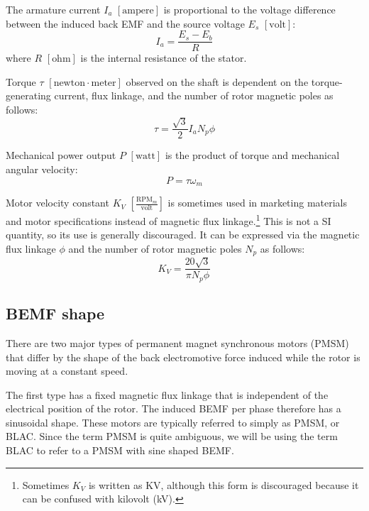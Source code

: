 \documentclass{zubaxdoc}
\begin{document}
The armature current $I_a$ $\left[\text{ampere}\right]$ is proportional to
the voltage difference between the induced back EMF and
the source voltage $E_s$ $\left[\text{volt}\right]$:
\begin{equation}
I_a = \frac{E_s - E_b}{R}
\end{equation}
where $R$ $\left[\text{ohm}\right]$ is the internal resistance of the stator.

Torque $\tau$ $\left[\text{newton}\cdot{}\text{meter}\right]$ observed on the shaft is dependent on the
torque-generating current, flux linkage, and the number of rotor magnetic poles as follows:
\begin{equation}
\tau = \frac{\sqrt{3}}{2} I_a N_p \phi
\end{equation}

Mechanical power output $P$ $\left[\text{watt}\right]$
is the product of torque and mechanical angular velocity:
\begin{equation}
P = \tau \omega_m
\end{equation}

Motor velocity constant $K_V$ $\left[\frac{\text{RPM}_m}{\text{volt}}\right]$
is sometimes used in marketing materials and motor specifications
instead of magnetic flux linkage.\footnote{Sometimes $K_V$ is written as KV, although
this form is discouraged because it can be confused with kilovolt (kV).}
This is not a SI quantity, so its use is generally discouraged.
It can be expressed via the magnetic flux linkage $\phi$
and the number of rotor magnetic poles $N_p$ as follows:
\begin{equation}
K_V = \frac{20 \sqrt{3}}{\pi  N_p \phi }
\end{equation}

\subsection{BEMF shape}

There are two major types of permanent magnet synchronous motors (PMSM) that differ by the shape of the back
electromotive force induced while the rotor is moving at a constant speed.

The first type has a fixed magnetic flux linkage that is independent of the electrical position of the rotor.
The induced BEMF per phase therefore has a sinusoidal shape.
These motors are typically referred to simply as PMSM, or BLAC.
Since the term PMSM is quite ambiguous, we will be using the term BLAC to refer to a PMSM with sine shaped BEMF.
\end{document}
